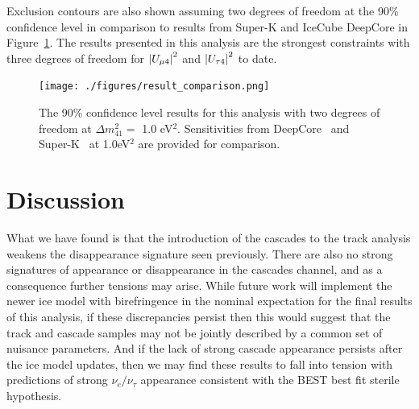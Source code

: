 \documentclass[main.tex]{subfiles}
\begin{document}
Exclusion contours are also shown assuming two degrees of freedom at the 90\% confidence level in comparison to results from Super-K and IceCube DeepCore in Figure~\ref{fig:comparison_results}. 
The results presented in this analysis are the strongest constraints with three degrees of freedom for $\left| U_{\mu 4} \right|^{2}$ and $\left| U_{\tau 4} \right|^{2}$ to date. 


\begin{figure}
    \centering
    \texttt{[image: ./figures/result\_comparison.png]}
    \caption{The 90\% confidence level results for this analysis with two degrees of freedom at $\Delta m_{41}^{2}=$ 1.0 eV$^{2}$. Sensitivities from DeepCore~\cite{Aartsen_2017_dc} and Super-K~\cite{PhysRevD.91.052019} at 1.0eV$^{2}$ are provided for comparison.}\label{fig:comparison_results}
\end{figure}    

\section{Discussion}

What we have found is that the introduction of the cascades to the track analysis weakens the disappearance signature seen previously.
There are also no strong signatures of appearance or disappearance in the cascades channel, and as a consequence further tensions may arise. 
While future work will implement the newer ice model with birefringence in the nominal expectation for the final results of this analysis, if these discrepancies persist then this would suggest that the track and cascade samples may not be jointly described by a common set of nuisance parameters.
And if the lack of strong cascade appearance persists after the ice model updates, then we may find these results to fall into tension with predictions of strong $\nu_{e}/\nu_{\tau}$ appearance consistent with the BEST best fit sterile hypothesis.  
\end{document}
